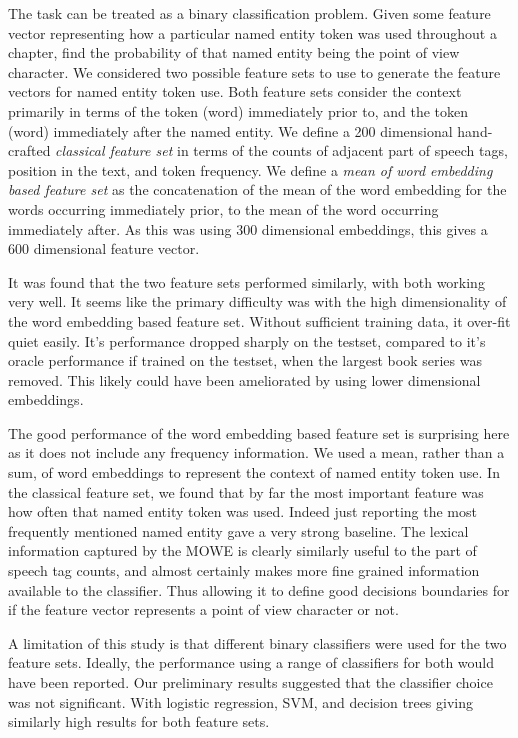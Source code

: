 \documentclass{book}
\begin{document}
The task can be treated as a binary classification problem.
Given some feature vector representing how a particular named entity token was used throughout a chapter,
find the probability of that named entity being the point of view character.
We considered two possible feature sets to use to generate the feature vectors for named entity token use.
Both feature sets consider the context primarily in terms of the token (word) immediately prior to, and the token (word) immediately after the named entity.
We define a 200 dimensional hand-crafted \emph{classical feature set} in terms of the counts of adjacent part of speech tags, position in the text, and token frequency.
We define a \emph{mean of word embedding based feature set} as the concatenation of the mean of the word embedding for the words occurring immediately prior, to the mean of the word occurring immediately after.
As this was using 300 dimensional embeddings, this gives a 600 dimensional feature vector.


It was found that the two feature sets performed similarly, with both working very well.
It seems like the primary difficulty was with the high dimensionality of the word embedding based feature set.
Without sufficient training data, it over-fit quiet easily.
It's performance dropped sharply on the testset, compared to it's oracle performance if trained on the testset,
when the largest book series was removed.
This likely could have been ameliorated by using lower dimensional embeddings.

The good performance of the word embedding based feature set is surprising here as it does not include any frequency information.
We used a mean, rather than a sum, of word embeddings to represent the context of named entity token use.
In the classical feature set, we found that by far the most important feature was how often that named entity token was used.
Indeed just reporting the most frequently mentioned named entity gave a very strong baseline.
The lexical information captured by the MOWE is clearly similarly useful to the part of speech tag counts, and almost certainly makes more fine grained information available to the classifier.
Thus allowing it to define good decisions boundaries for if the feature vector represents a point of view character or not.


A limitation of this study is that different binary classifiers were used for the two feature sets.
Ideally, the performance using a range of classifiers for both would have been reported.
Our preliminary results suggested that the classifier choice was not significant.
With logistic regression, SVM, and decision trees giving similarly high results for both feature sets.
 
\end{document}
